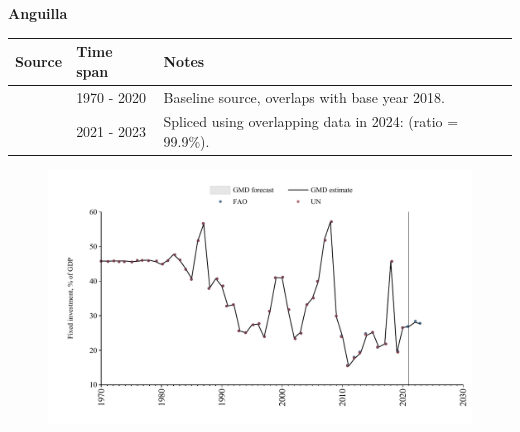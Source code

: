 \documentclass[12pt,a4paper,landscape]{article}
\begin{document}
\begin{adjustbox}{max totalsize={\paperwidth}{\paperheight},center}
\begin{minipage}[t][\textheight][t]{\textwidth}
\vspace*{0.5cm}
{}
\begin{center}
{\Large\bfseries Anguilla}
\end{center}
\vspace{0.5cm}
\begin{table}[H]
\centering
\small
\begin{tabular}{|l|l|l|}
\hline
\textbf{Source} & \textbf{Time span} & \textbf{Notes} \\
\hline
\rowcolor{white}\cite{UN}& 1970 - 2020 &Baseline source, overlaps with base year 2018.\\
\rowcolor{lightgray}\cite{FAO}& 2021 - 2023 &Spliced using overlapping data in 2024: (ratio = 99.9\%).\\
\hline
\end{tabular}
\end{table}
\begin{figure}[H]
\centering
\includegraphics[width=\textwidth,height=0.6\textheight,keepaspectratio]{graphs/AIA_finv_GDP.pdf}
\end{figure}
\end{minipage}
\end{adjustbox}
\end{document}

